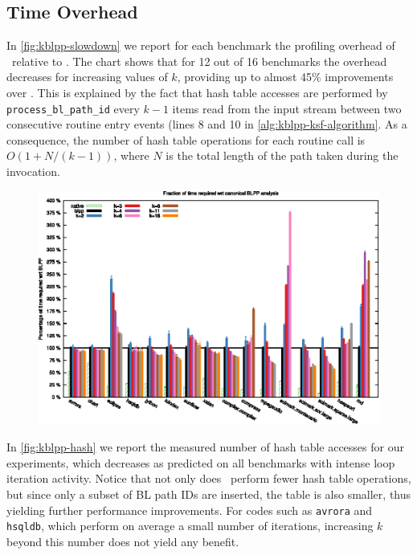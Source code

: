 \subsection{Time Overhead}
\label{ss:eval-kblpp-time}

In \myfigure\ref{fig:kblpp-slowdown} we report for each benchmark the profiling overhead of \kblpp\ relative to \blpp. The chart shows that for 12 out of 16 benchmarks the overhead decreases for increasing values of $k$, providing up to almost 45\% improvements over \blpp. This is explained by the fact that hash table accesses are performed by {\tt process\_bl\_path\_id} every $k-1$ items read from the input stream between two consecutive routine entry events (lines 8 and 10 in \myalgorithm\ref{alg:kblpp-ksf-algorithm}. As a consequence, the number of hash table operations for each routine call is $O(1+N/(k-1))$, where $N$ is the total length of the path taken during the invocation.

\ifdefined\noauthorea
\begin{figure}[!ht]
\begin{center}
\includegraphics[width=\textwidth]{figures/kblpp-slowdown/kblpp-slowdown.eps}
\caption{\protect}
\end{center}
\end{figure}
\fi

\noindent In \myfigure\ref{fig:kblpp-hash} we report the measured number of hash table accesses for our experiments, which decreases as predicted on all benchmarks with intense loop iteration activity. Notice that not only does \kblpp\ perform fewer hash table operations, but since only a subset of BL path IDs are inserted, the table is also smaller, thus yielding further performance improvements. For codes such as {\tt avrora} and {\tt hsqldb}, which perform on average a small number of iterations, increasing $k$ beyond this number does not yield any benefit.

